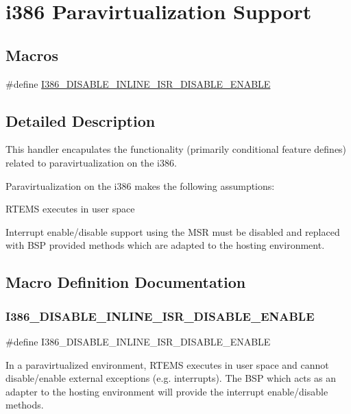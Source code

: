\hypertarget{group__RTEMSScoreCPUi386Paravirt}{}\section{i386 Paravirtualization Support}
\label{group__RTEMSScoreCPUi386Paravirt}
\subsection*{Macros}
\begin{DoxyCompactItemize}
\item 
\#define \mbox{\hyperlink{group__RTEMSScoreCPUi386Paravirt_ga00ad7199ff1900ae146982e9b9c78aee}{I386\+\_\+\+D\+I\+S\+A\+B\+L\+E\+\_\+\+I\+N\+L\+I\+N\+E\+\_\+\+I\+S\+R\+\_\+\+D\+I\+S\+A\+B\+L\+E\+\_\+\+E\+N\+A\+B\+LE}}
\end{DoxyCompactItemize}


\subsection{Detailed Description}
This handler encapulates the functionality (primarily conditional feature defines) related to paravirtualization on the i386.

Paravirtualization on the i386 makes the following assumptions\+:


\begin{DoxyItemize}
\item R\+T\+E\+MS executes in user space
\item Interrupt enable/disable support using the M\+SR must be disabled and replaced with B\+SP provided methods which are adapted to the hosting environment. 
\end{DoxyItemize}

\subsection{Macro Definition Documentation}
\mbox{\label{group__RTEMSScoreCPUi386Paravirt_ga00ad7199ff1900ae146982e9b9c78aee}} 
\subsubsection{\texorpdfstring{I386\_DISABLE\_INLINE\_ISR\_DISABLE\_ENABLE}{I386\_DISABLE\_INLINE\_ISR\_DISABLE\_ENABLE}}
{\footnotesize\ttfamily \#define I386\+\_\+\+D\+I\+S\+A\+B\+L\+E\+\_\+\+I\+N\+L\+I\+N\+E\+\_\+\+I\+S\+R\+\_\+\+D\+I\+S\+A\+B\+L\+E\+\_\+\+E\+N\+A\+B\+LE}

In a paravirtualized environment, R\+T\+E\+MS executes in user space and cannot disable/enable external exceptions (e.\+g. interrupts). The B\+SP which acts as an adapter to the hosting environment will provide the interrupt enable/disable methods. 